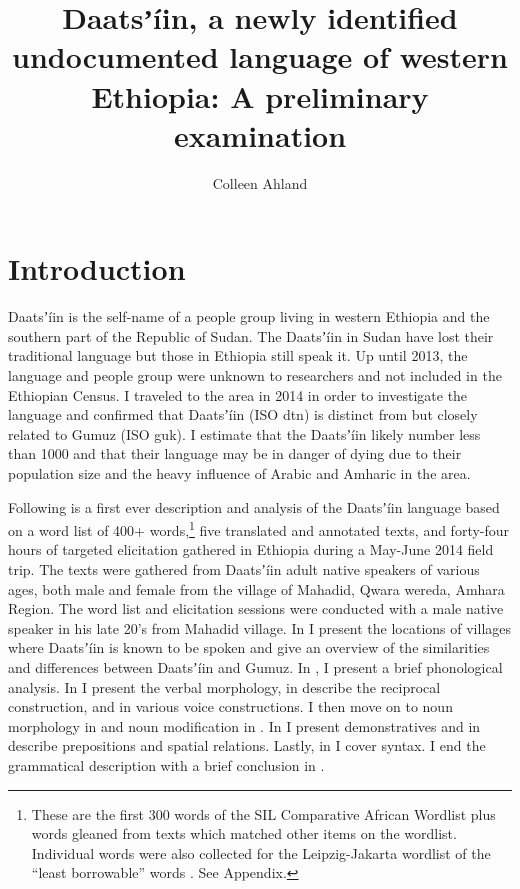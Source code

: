 \documentclass[output=paper]{langsci/langscibook}
\title{Daatsʼíin, a newly identified undocumented language of western Ethiopia: A preliminary examination}
\author{%
 Colleen Ahland \affiliation{SIL International} 
}
\begin{document}

\section{Introduction}\label{sec:ahlandc:1}

Daatsʼíin is the self-name of a people group living in western Ethiopia and the southern part of the Republic of Sudan. The Daatsʼíin in Sudan have lost their traditional language but those in Ethiopia still speak it. Up until 2013, the language and people group were unknown to researchers and not included in the Ethiopian Census. I traveled to the area in 2014 in order to investigate the language and confirmed that Daatsʼíin (ISO dtn) is distinct from but closely related to Gumuz (ISO guk). I estimate that the Daatsʼíin likely number less than 1000 and that their language may be in danger of dying due to their population size and the heavy influence of Arabic and Amharic in the area.

Following is a first ever description and analysis of the Daatsʼíin language based on a word list of 400+ words,\footnote{These are the first 300 words of the SIL Comparative African Wordlist \citep{SniderRoberts2006} plus words gleaned from texts which matched other items on the wordlist. Individual words were also collected for the Leipzig-Jakarta wordlist of the “least borrowable” words \citep{HaspelmathTadmor2009}. See Appendix.} five translated and annotated texts, and forty-four hours of targeted elicitation gathered in Ethiopia during a May-June 2014 field trip. The texts were gathered from Daatsʼíin adult native speakers of various ages, both male and female from the village of Mahadid, Qwara wereda, Amhara Region. The word list and elicitation sessions were conducted with a male native speaker in his late 20’s from Mahadid village. In  I present the locations of villages where Daatsʼíin is known to be spoken and give an overview of the similarities and differences between Daatsʼíin and Gumuz. In , I present a brief phonological analysis. In  I present the verbal morphology, in  describe the reciprocal construction, and in  various voice constructions. I then move on to noun morphology in  and noun modification in . In  I present demonstratives and in  describe prepositions and spatial relations. Lastly, in  I cover syntax. I end the grammatical description with a brief conclusion in .
\end{document}
